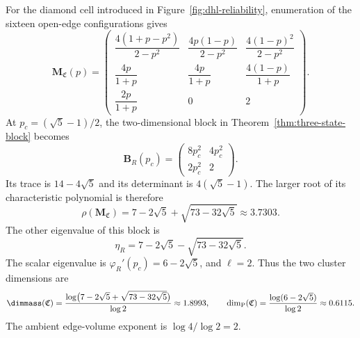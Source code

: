 \begin{example}\label{ex:dhl-response}\label{ex:dhl-dimensions}
For the diamond cell introduced in Figure~\ref{fig:dhl-reliability}, enumeration of the sixteen open-edge configurations gives
\[
\mathbf M_{\mathfrak C}(p)=
\begin{pmatrix}
\dfrac{4(1+p-p^2)}{2-p^2}&\dfrac{4p(1-p)}{2-p^2}&\dfrac{4(1-p)^2}{2-p^2}\\[2ex]
\dfrac{4p}{1+p}&\dfrac{4p}{1+p}&\dfrac{4(1-p)}{1+p}\\[2ex]
\dfrac{2p}{1+p}&0&2
\end{pmatrix}.
\]
At $p_c=(\sqrt5-1)/2$, the two-dimensional block in Theorem~\ref{thm:three-state-block} becomes
\[
\mathbf B_R(p_c)=
\begin{pmatrix}
8p_c^2&4p_c^2\\
2p_c^2&2
\end{pmatrix}.
\]
Its trace is $14-4\sqrt5$ and its determinant is $4(\sqrt5-1)$.
The larger root of its characteristic polynomial is therefore
\[
\rho(\mathbf M_{\mathfrak C})=7-2\sqrt5+\sqrt{73-32\sqrt5}
\approx3.7303.
\]
The other eigenvalue of this block is
\[
 \eta_R=7-2\sqrt5-\sqrt{73-32\sqrt5}.
\]
The scalar eigenvalue is $\varphi_R'(p_c)=6-2\sqrt5$, and $\ell=2$.
Thus the two cluster dimensions are
\[
 \dimmass(\mathfrak C)
 =\frac{\log\bigl(7-2\sqrt5+\sqrt{73-32\sqrt5}\bigr)}{\log2}
 \approx1.8993,\qquad
 \dim_{\mathrm P}(\mathfrak C)
 =\frac{\log(6-2\sqrt5)}{\log2}\approx0.6115.
\]
The ambient edge-volume exponent is $\log4/\log2=2$.
\end{example}






